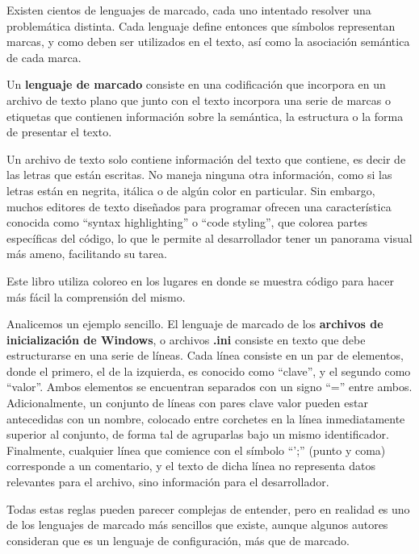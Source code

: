 Existen cientos de lenguajes de marcado, cada uno intentado resolver una problemática
distinta. Cada lenguaje define entonces que símbolos representan marcas, y como
deben ser utilizados en el texto, así como la asociación semántica de cada
marca.\autocite{coombs_1987}

\begin{definition}
    Un \textbf{lenguaje de marcado} consiste en una codificación que incorpora
    en un archivo de texto plano que junto con el texto incorpora una serie de
    marcas o etiquetas que contienen información sobre la semántica, la
    estructura o la forma de presentar el texto.
\end{definition}

\begin{knowwhat}
    Un archivo de texto solo contiene información del texto que contiene, es decir
    de las letras que están escritas. No maneja ninguna otra información, como
    si las letras están en negrita, itálica o de algún color en particular.
    Sin embargo, muchos editores de texto diseñados para programar ofrecen una
    característica conocida como ``syntax highlighting'' o ``code styling'', que
    colorea partes específicas del código, lo que le permite al desarrollador
    tener un panorama visual más ameno, facilitando su tarea.

    Este libro utiliza coloreo en los lugares en donde se muestra
    código para hacer más fácil la comprensión del mismo.
\end{knowwhat}

Analicemos un ejemplo sencillo. El lenguaje de marcado de los \textbf{archivos
de inicialización de Windows}, o archivos \textbf{.ini} consiste en texto que
debe estructurarse en una serie de líneas. Cada línea consiste en un par de
elementos, donde el primero, el de la izquierda, es conocido como ``clave'',
y el segundo como ``valor''. Ambos elementos se encuentran separados con un
signo ``='' entre ambos. Adicionalmente, un conjunto de líneas con pares clave
valor pueden estar antecedidas con un nombre, colocado entre corchetes en la
línea inmediatamente superior al conjunto, de forma tal de agruparlas bajo
un mismo identificador. Finalmente, cualquier línea que comience con el símbolo 
``';'' (punto y coma) corresponde a un comentario, y el texto de dicha línea no
representa datos relevantes para el archivo, sino información para el desarrollador.
\autocite{getPrivateProfileString_2018}

Todas estas reglas pueden parecer complejas de entender, pero en realidad es uno
de los lenguajes de marcado más sencillos que existe, aunque algunos autores
consideran que es un lenguaje de configuración, más que de marcado.

